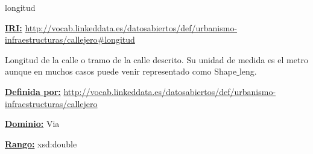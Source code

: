 \begin{mybox}{longitud}
\begin{flushleft}
\underline{\textbf{IRI:}}
\url{http://vocab.linkeddata.es/datosabiertos/def/urbanismo-infraestructuras/callejero#longitud}
\newline

Longitud de la calle o tramo de la calle descrito. Su unidad de medida es el metro aunque en muchos casos puede venir representado como Shape$\_$leng.
\newline

\underline{\textbf{Definida por:}}\newline
\url{http://vocab.linkeddata.es/datosabiertos/def/urbanismo-infraestructuras/callejero}
\newline

\underline{\textbf{Dominio:}}
		Via
\newline

\underline{\textbf{Rango:}}
		xsd:double

\end{flushleft}
\end{mybox}













